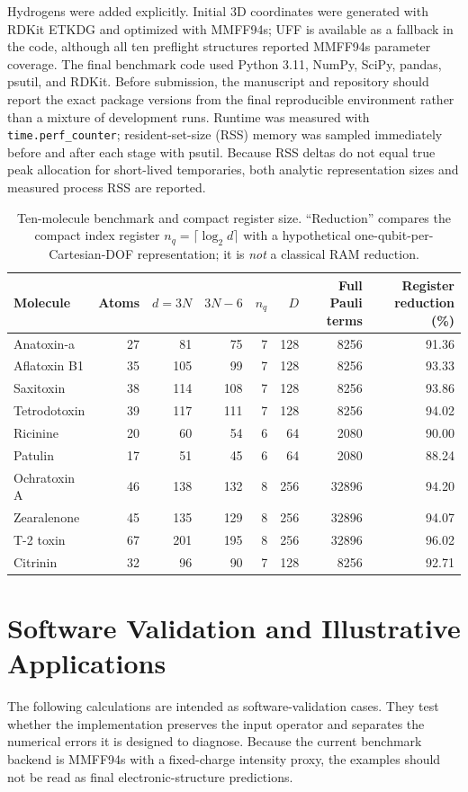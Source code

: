 \documentclass[aip,jcp,reprint,amsmath,amssymb,floatfix]{revtex4-2}
\begin{document}
Hydrogens were added explicitly. Initial 3D coordinates were generated with RDKit ETKDG and optimized with MMFF94s; UFF is available as a fallback in the code, although all ten preflight structures reported MMFF94s parameter coverage.\cite{Halgren1996MMFF1} The final benchmark code used Python 3.11, NumPy, SciPy, pandas, psutil, and RDKit. Before submission, the manuscript and repository should report the exact package versions from the final reproducible environment rather than a mixture of development runs. Runtime was measured with \texttt{time.perf\_counter}; resident-set-size (RSS) memory was sampled immediately before and after each stage with psutil. Because RSS deltas do not equal true peak allocation for short-lived temporaries, both analytic representation sizes and measured process RSS are reported.

\begin{table}[t]
\caption{Ten-molecule benchmark and compact register size. ``Reduction'' compares the compact index register $n_q=\lceil\log_2 d\rceil$ with a hypothetical one-qubit-per-Cartesian-DOF representation; it is \emph{not} a classical RAM reduction.}
\label{tab:benchmark}
\centering
\scriptsize
\begin{tabular}{lrrrrrrr}
\toprule
Molecule & Atoms & $d=3N$ & $3N-6$ & $n_q$ & $D$ & Full Pauli terms & Register reduction (\%)\\
\midrule
Anatoxin-a     & 27 & 81  & 75  & 7 & 128 & 8256  & 91.36\\
Aflatoxin B1   & 35 & 105 & 99  & 7 & 128 & 8256  & 93.33\\
Saxitoxin      & 38 & 114 & 108 & 7 & 128 & 8256  & 93.86\\
Tetrodotoxin   & 39 & 117 & 111 & 7 & 128 & 8256  & 94.02\\
Ricinine       & 20 & 60  & 54  & 6 & 64  & 2080  & 90.00\\
Patulin        & 17 & 51  & 45  & 6 & 64  & 2080  & 88.24\\
Ochratoxin A   & 46 & 138 & 132 & 8 & 256 & 32896 & 94.20\\
Zearalenone    & 45 & 135 & 129 & 8 & 256 & 32896 & 94.07\\
T-2 toxin      & 67 & 201 & 195 & 8 & 256 & 32896 & 96.02\\
Citrinin       & 32 & 96  & 90  & 7 & 128 & 8256  & 92.71\\
\bottomrule
\end{tabular}
\end{table}

\section{Software Validation and Illustrative Applications}
The following calculations are intended as software-validation cases. They test whether the implementation preserves the input operator and separates the numerical errors it is designed to diagnose. Because the current benchmark backend is MMFF94s with a fixed-charge intensity proxy, the examples should not be read as final electronic-structure predictions.
\end{document}
